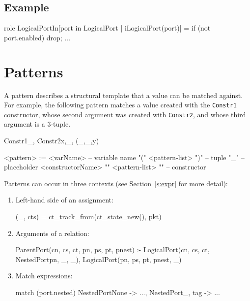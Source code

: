 \documentclass{report}
\newcommand{\src}[1]{\texttt{#1}}
\begin{document}
\subsection*{Example}

\begin{ccnlisting}{}
role LogicalPortIn[port in LogicalPort | iLogicalPort(port)] = 
    if (not port.enabled) drop;
    ...
\end{ccnlisting}

\section{Patterns}\label{s:pattern}

A pattern describes a structural template that a value can be 
matched against. For example, the following pattern matches a 
value created with the \src{Constr1} constructor, whose second
argument was created with \src{Constr2}, and whose third 
argument is a 3-tuple.  
\begin{ccnlisting}{}
Constr1{_, Constr2{x,_}, (_,_,y)}
\end{ccnlisting}

\begin{bnflisting}{}
<pattern> := <varName>                                -- variable name
             "(" <pattern-list> ")"                   -- tuple
             "_"                                      -- placeholder
             <constructorName> "{" <pattern-list> "}" -- constructor
\end{bnflisting}

Patterns can occur in three contexts (see Section~\ref{s:expr} for more detail): 
\begin{enumerate}
    \item Left-hand side of an assignment:
\begin{ccnlisting}{}
(_, cts) = ct_track_from(ct_state_new(), pkt)
\end{ccnlisting}

    \item Arguments of a relation:
\begin{ccnlisting}{}
ParentPort(cn, cs, ct, pn, ps, pt, pnest) :- 
    LogicalPort(cn, cs, ct, NestedPort{pn, _}, _),
    LogicalPort(pn, ps, pt, pnest, _)
\end{ccnlisting}

    \item Match expressions:
\begin{ccnlisting}{}
match (port.nested) {
    NestedPortNone     -> ...,
    NestedPort{_, tag} -> ... 
}
\end{ccnlisting}
\end{enumerate}
\end{document}
